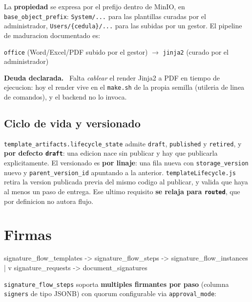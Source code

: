 \documentclass[11pt,a4paper,oneside]{report}
\newenvironment{nota}[1][Nota]{%
  \par\medskip
  \colorlet{shadecolor}{black!6}%
  \begin{shaded}\noindent\textbf{#1.}\ \ignorespaces}%
  {\end{shaded}\par\medskip}
\newcommand{\rt}[1]{\texttt{#1}}
\begin{document}
La \textbf{propiedad} se expresa por el prefijo dentro de MinIO, en \rt{base\_object\_prefix}:
\rt{System/...} para las plantillas curadas por el administrador, \rt{Users/\{cedula\}/...}
para las subidas por un gestor. El pipeline de maduracion documentado es:

\begin{center}
\rt{office} (Word/Excel/PDF subido por el gestor) $\longrightarrow$
\rt{jinja2} (curado por el administrador)
\end{center}

\begin{nota}[Deuda declarada]
Falta \emph{cablear} el render Jinja2 a PDF en tiempo de ejecucion: hoy el render vive en el
\rt{make.sh} de la propia semilla (utileria de linea de comandos), y el backend no lo invoca.
\end{nota}

\subsection{Ciclo de vida y versionado}

\rt{template\_artifacts.lifecycle\_state} admite \rt{draft}, \rt{published} y \rt{retired}, y
\textbf{por defecto \rt{draft}}: una edicion nace sin publicar y hay que publicarla
explicitamente. El versionado es \textbf{por linaje}: una fila nueva con
\rt{storage\_version} nuevo y \rt{parent\_version\_id} apuntando a la anterior.
\rt{templateLifecycle.js} retira la version publicada previa del mismo codigo al publicar, y
valida que haya al menos un paso de entrega. Ese ultimo requisito \textbf{se relaja para
\rt{routed}}, que por definicion no autora flujo.

\section{Firmas}

\begin{diagrama}
signature_flow_templates  ->  signature_flow_steps  ->  signature_flow_instances
                                                              |
                                                              v
                                          signature_requests  ->  document_signatures
\end{diagrama}

\rt{signature\_flow\_steps} soporta \textbf{multiples firmantes por paso} (columna
\rt{signers} de tipo JSONB) con quorum configurable via \rt{approval\_mode}:
\end{document}
